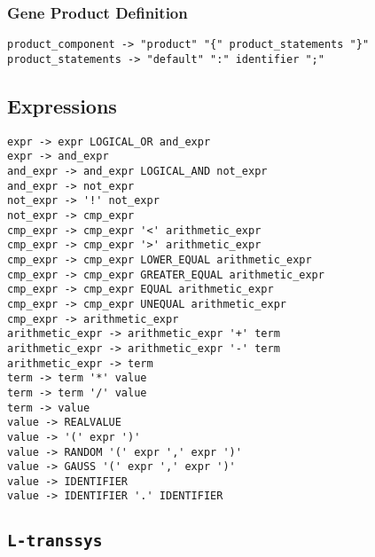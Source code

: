 \documentclass[12pt]{article}
\newcommand{\transsys}{\texttt{transsys}}
\newcommand{\ltranssys}{\texttt{L-}\transsys}
\begin{document}
\subsubsection{Gene Product Definition}

\begin{footnotesize}
\begin{verbatim}
product_component -> "product" "{" product_statements "}"
product_statements -> "default" ":" identifier ";"
\end{verbatim}
\end{footnotesize}


\subsection{Expressions}

\begin{footnotesize}
\begin{verbatim}
expr -> expr LOGICAL_OR and_expr
expr -> and_expr
and_expr -> and_expr LOGICAL_AND not_expr
and_expr -> not_expr
not_expr -> '!' not_expr
not_expr -> cmp_expr
cmp_expr -> cmp_expr '<' arithmetic_expr
cmp_expr -> cmp_expr '>' arithmetic_expr
cmp_expr -> cmp_expr LOWER_EQUAL arithmetic_expr
cmp_expr -> cmp_expr GREATER_EQUAL arithmetic_expr
cmp_expr -> cmp_expr EQUAL arithmetic_expr
cmp_expr -> cmp_expr UNEQUAL arithmetic_expr
cmp_expr -> arithmetic_expr
arithmetic_expr -> arithmetic_expr '+' term
arithmetic_expr -> arithmetic_expr '-' term
arithmetic_expr -> term
term -> term '*' value
term -> term '/' value
term -> value
value -> REALVALUE
value -> '(' expr ')'
value -> RANDOM '(' expr ',' expr ')'
value -> GAUSS '(' expr ',' expr ')'
value -> IDENTIFIER
value -> IDENTIFIER '.' IDENTIFIER
\end{verbatim}
\end{footnotesize}


\subsection{\ltranssys{}}
\end{document}
